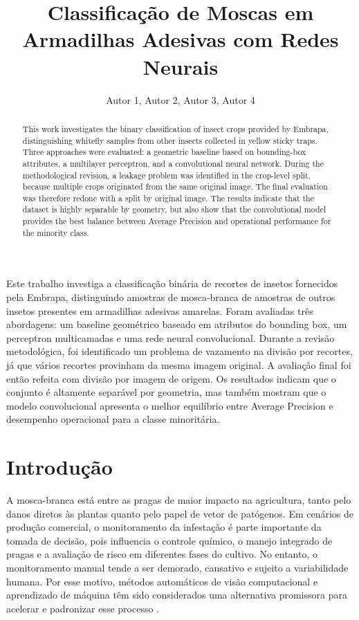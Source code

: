 \documentclass[12pt]{article}
\title{Classificação de Moscas em Armadilhas Adesivas com Redes Neurais}
\author{Autor 1\inst{1}, Autor 2\inst{1}, Autor 3\inst{1}, Autor 4\inst{1}}
\begin{document}
\maketitle

\begin{abstract}
This work investigates the binary classification of insect crops provided by
Embrapa, distinguishing whitefly samples from other insects collected in yellow
sticky traps. Three approaches were evaluated: a geometric baseline based on
bounding-box attributes, a multilayer perceptron, and a convolutional neural
network. During the methodological revision, a leakage problem was identified
in the crop-level split, because multiple crops originated from the same
original image. The final evaluation was therefore redone with a split by
original image. The results indicate that the dataset is highly separable by
geometry, but also show that the convolutional model provides the best balance
between Average Precision and operational performance for the minority class.
\end{abstract}

\begin{resumo}
Este trabalho investiga a classificação binária de recortes de insetos
fornecidos pela Embrapa, distinguindo amostras de mosca-branca de amostras de
outros insetos presentes em armadilhas adesivas amarelas. Foram avaliadas três
abordagens: um baseline geométrico baseado em atributos do bounding box, um
perceptron multicamadas e uma rede neural convolucional. Durante a revisão
metodológica, foi identificado um problema de vazamento na divisão por
recortes, já que vários recortes provinham da mesma imagem original. A
avaliação final foi então refeita com divisão por imagem de origem. Os
resultados indicam que o conjunto é altamente separável por geometria, mas
também mostram que o modelo convolucional apresenta o melhor equilíbrio entre
Average Precision e desempenho operacional para a classe minoritária.
\end{resumo}

\section{Introdução}

A mosca-branca está entre as pragas de maior impacto na agricultura, tanto pelo
danos diretos às plantas quanto pelo papel de vetor de patógenos. Em cenários
de produção comercial, o monitoramento da infestação é parte importante da
tomada de decisão, pois influencia o controle químico, o manejo integrado de
pragas e a avaliação de risco em diferentes fases do cultivo. No entanto, o
monitoramento manual tende a ser demorado, cansativo e sujeito a variabilidade
humana. Por esse motivo, métodos automáticos de visão computacional e
aprendizado de máquina têm sido considerados uma alternativa promissora para
acelerar e padronizar esse processo \cite{jige2017,barbedo2014}.
\end{document}
